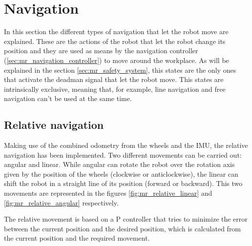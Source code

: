 \section{Navigation} %
\label{sec:mr_navigation}
In this section the different types of navigation that let the robot move are explained.
These are the actions of the robot that let the robot change its position and they are used as means by the navigation controller (\ref{sec:mr_navigation_controller}) to move around the workplace.
As will be explained in the section \ref{sec:mr_safety_system}, this states are the only ones that activate the deadman signal that let the robot move.
This states are intrinsically exclusive, meaning that, for example, line navigation and free navigation can't be used at the same time.

    \subsection{Relative navigation} %
    \label{sub:mr_relative_navigation}
    Making use of the combined odometry from the wheels and the IMU, the relative navigation has been implemented.
    Two different movements can be carried out: angular and linear.
    While angular can rotate the robot over the rotation axis given by the position of the wheels (clockwise or anticlockwise), the linear can shift the robot in a straight line of its position (forward or backward).
    This two movements are represented in the figures \ref{fig:mr_relative_linear} and \ref{fig:mr_relative_angular} respectively.

    The relative movement is based on a P controller that tries to minimize the error between the current position and the desired position, which is calculated from the current position and the required movement.

